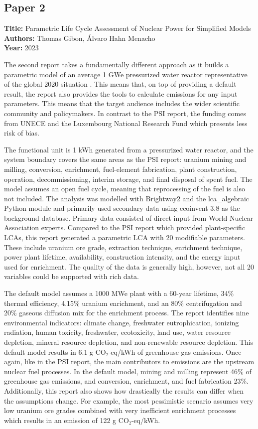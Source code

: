 \documentclass[9pt]{extarticle}
\begin{document}
\subsection{Paper 2 \parencite{yannik2}}
\textbf{Title:} Parametric Life Cycle Assessment of Nuclear Power for Simplified Models\\
\textbf{Authors:} Thomas Gibon, Álvaro Hahn Menacho\\
\textbf{Year:} 2023

The second report takes a fundamentally different approach as it builds a parametric
model of an average 1 GWe pressurized water reactor representative of the global 2020
situation \parencite{yannik2}. This means that, on top of providing a default result,
the report also provides the tools to calculate emissions for any input parameters.
This means that the target audience includes the wider scientific community and
policymakers. In contrast to the PSI report, the funding comes from UNECE and the
Luxembourg National Research Fund which presents less risk of bias.

The functional unit is 1 kWh generated from a pressurized water reactor, and the system
boundary covers the same areas as the PSI report: uranium mining and milling,
conversion, enrichment, fuel-element fabrication, plant construction, operation,
decommissioning, interim storage, and final disposal of spent fuel. The model assumes
an open fuel cycle, meaning that reprocessing of the fuel is also not included. The
analysis was modelled with Brightway2 and the lca\_algebraic Python module and primarily
used secondary data using ecoinvent 3.8 as the background database. Primary data
consisted of direct input from World Nuclear Association experts. Compared to the PSI
report which provided plant-specific LCAs, this report generated a parametric LCA with
20 modifiable parameters. These include uranium ore grade, extraction technique,
enrichment technique, power plant lifetime, availability, construction intensity, and
the energy input used for enrichment. The quality of the data is generally high,
however, not all 20 variables could be supported with rich data.

The default model assumes a 1000 MWe plant with a 60-year lifetime, 34\% thermal
efficiency, 4.15\% uranium enrichment, and an 80\% centrifugation and 20\% gaseous
diffusion mix for the enrichment process. The report identifies nine environmental
indicators: climate change, freshwater eutrophication, ionizing radiation, human
toxicity, freshwater, ecotoxicity, land use, water resource depletion, mineral
resource depletion, and non-renewable resource depletion. This default model results
in 6.1 g CO₂-eq/kWh of greenhouse gas emissions. Once again, like in the PSI report,
the main contributors to emissions are the upstream nuclear fuel processes.
In the default model, mining and milling represent 46\% of greenhouse gas emissions,
and conversion, enrichment, and fuel fabrication 23\%. Additionally, this report also
shows how drastically the results can differ when the assumptions change. For example,
the most pessimistic scenario assumes very low uranium ore grades combined with very
inefficient enrichment processes which results in an emission of 122 g CO₂-eq/kWh.
\end{document}
